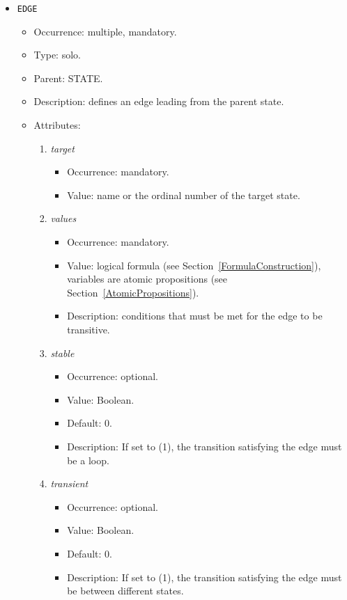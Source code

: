 \documentclass[12pt]{article}
\newenvironment{menum}{
\begin{enumerate}
  \setlength{\itemsep}{0pt}
  \setlength{\parskip}{0pt}
  \setlength{\parsep}{0pt}
}{\end{enumerate}}
\newenvironment{mitem}{
\begin{itemize}
  \setlength{\itemsep}{0pt}
  \setlength{\parskip}{0pt}
  \setlength{\parsep}{0pt}
}{\end{itemize}}
\begin{document}
\begin{mitem}
	\item \texttt{EDGE}
	\begin{mitem}
		\item Occurrence: multiple, mandatory.
		\item Type: solo.
		\item Parent: STATE.
		\item Description: defines an edge leading from the parent state.
		\item Attributes: 
		\begin{menum}
			\item \textit{target} 
			\begin{mitem}
				\item Occurrence: mandatory.
				\item Value: name or the ordinal number of the target state.
			\end{mitem}
			\item \textit{values} 
			\begin{mitem}
				\item Occurrence: mandatory.
				\item Value: logical formula (see Section~\ref{FormulaConstruction}), variables are atomic propositions (see Section~\ref{AtomicPropositions}).
				\item Description: conditions that must be met for the edge to be transitive.
			\end{mitem}
			\item \textit{stable} 
			\begin{mitem}
				\item Occurrence: optional.
				\item Value: Boolean.
				\item Default: 0.
				\item Description: If set to (1), the transition satisfying the edge must be a loop.
			\end{mitem}
			\item \textit{transient} 
			\begin{mitem}
				\item Occurrence: optional.
				\item Value: Boolean.
				\item Default: 0.
				\item Description: If set to (1), the transition satisfying the edge must be between different states.
			\end{mitem}
		\end{menum}
	\end{mitem}			
\end{mitem}		
\end{document}
